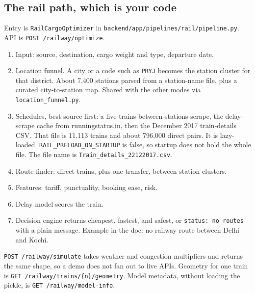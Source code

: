 \documentclass[a4paper,9.5pt]{extarticle}
\begin{document}
\subsection{The rail path, which is your code}
Entry is \texttt{RailCargoOptimizer} in \texttt{backend/app/pipelines/rail/pipeline.py}. API is \texttt{POST /railway/optimize}.
\begin{enumerate}
  \item Input: source, destination, cargo weight and type, departure date.
  \item Location funnel. A city or a code such as \texttt{PRYJ} becomes the station cluster for that district. About 7{,}400 stations parsed from a station-name file, plus a curated city-to-station map. Shared with the other modes via \texttt{location\_funnel.py}.
  \item \raggedright Schedules, best source first: a live trains-between-stations scrape, the delay-scrape cache from runningstatus.in, then the December 2017 train-details CSV. That file is 11{,}113 trains and about 796{,}000 direct pairs. It is lazy-loaded. \texttt{RAIL\_PRELOAD\_ON\_STARTUP} is false, so startup does not hold the whole file. The file name is \texttt{Train\_details\_22122017.csv}.\par
  \item Route finder: direct trains, plus one transfer, between station clusters.
  \item Features: tariff, punctuality, booking ease, risk.
  \item Delay model scores the train.
  \item Decision engine returns cheapest, fastest, and safest, or \texttt{status: no\_routes} with a plain message. Example in the doc: no railway route between Delhi and Kochi.
\end{enumerate}
\texttt{POST /railway/simulate} takes weather and congestion multipliers and returns the same shape, so a demo does not fan out to live APIs. Geometry for one train is \texttt{GET /railway/trains/\{n\}/geometry}. Model metadata, without loading the pickle, is \texttt{GET /railway/model-info}.
\end{document}
